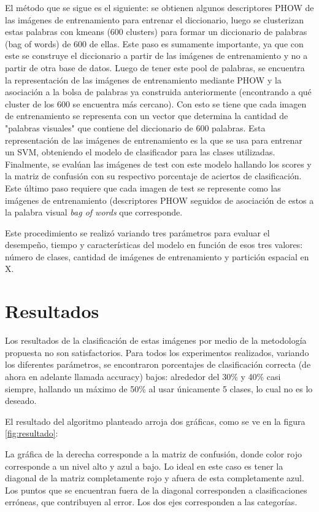 \documentclass[10pt,twocolumn,letterpaper]{article}
\begin{document}
El método que se sigue es el siguiente: se obtienen algunos descriptores PHOW de las imágenes de entrenamiento para entrenar el diccionario, luego se clusterizan estas palabras con kmeans (600 clusters) para formar un diccionario de palabras (bag of words) de 600 de ellas. Este paso es sumamente importante, ya que con este se construye el diccionario a partir de las imágenes de entrenamiento y no a partir de otra base de datos. Luego de tener este pool de palabras, se encuentra la representación de las imágenes de entrenamiento mediante PHOW y la asociación a la bolsa de palabras ya construida anteriormente (encontrando a qué cluster de los 600 se encuentra más cercano). Con esto se tiene que cada imagen de entrenamiento se representa con un vector que determina la cantidad de "palabras visuales" que contiene del diccionario de 600 palabras. Esta representación de las imágenes de entrenamiento es la que se usa para entrenar un SVM, obteniendo el modelo de clasificador para las clases utilizadas. Finalmente, se evalúan las imágenes de test con este modelo hallando los scores y la matriz de confusión con su respectivo porcentaje de aciertos de clasificación. Este último paso requiere que cada imagen de test se represente como las imágenes de entrenamiento (descriptores PHOW seguidos de asociación de estos a la palabra visual \textit{bag of words} que corresponde. \cite{Szeliski}

Este procedimiento se realizó variando tres parámetros para evaluar el desempeño, tiempo y características del modelo en función de esos tres valores: número de clases, cantidad de imágenes de entrenamiento y partición espacial en X.
\section{Resultados}
Los resultados de la clasificación de estas imágenes por medio de la metodología propuesta no son satisfactorios. Para todos los experimentos realizados, variando los diferentes parámetros, se encontraron porcentajes de clasificación correcta (de ahora en adelante llamada accuracy) bajos: alrededor del 30\% y 40\% casi siempre, hallando un máximo de 50\% al usar únicamente 5 clases, lo cual no es lo deseado.

El resultado del algoritmo planteado arroja dos gráficas, como se ve en la figura \ref{fig:resultado}:

La gráfica de la derecha corresponde a la matriz de confusión, donde color rojo corresponde a un nivel alto y azul a bajo. Lo ideal en este caso es tener la diagonal de la matriz completamente rojo y afuera de esta completamente azul. Los puntos que se encuentran fuera de la diagonal corresponden a clasificaciones erróneas, que contribuyen al error. Los dos ejes corresponden a las categorías.
\end{document}
